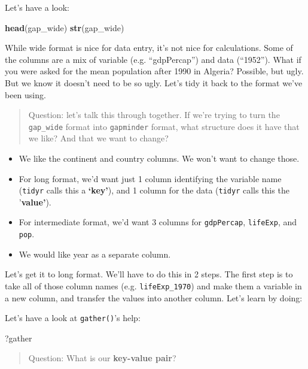 \documentclass[]{book}
\newenvironment{Shaded}{\begin{snugshade}}{\end{snugshade}}
\newcommand{\KeywordTok}[1]{\textcolor[rgb]{0.13,0.29,0.53}{\textbf{{#1}}}}
\newcommand{\NormalTok}[1]{{#1}}
\providecommand{\tightlist}{%
  \setlength{\itemsep}{0pt}\setlength{\parskip}{0pt}}
\theoremstyle{definition}
\theoremstyle{definition}
\theoremstyle{definition}
\theoremstyle{remark}
\begin{document}
Let's have a look:

\begin{Shaded}
\begin{Highlighting}[]
\KeywordTok{head}\NormalTok{(gap_wide)}
\KeywordTok{str}\NormalTok{(gap_wide)}
\end{Highlighting}
\end{Shaded}

While wide format is nice for data entry, it's not nice for
calculations. Some of the columns are a mix of variable (e.g.
``gdpPercap'') and data (``1952''). What if you were asked for the mean
population after 1990 in Algeria? Possible, but ugly. But we know it
doesn't need to be so ugly. Let's tidy it back to the format we've been
using.

\begin{quote}
Question: let's talk this through together. If we're trying to turn the
\texttt{gap\_wide} format into \texttt{gapminder} format, what structure
does it have that we like? And that we want to change?
\end{quote}

\begin{itemize}
\tightlist
\item
  We like the continent and country columns. We won't want to change
  those.
\item
  For long format, we'd want just 1 column identifying the variable name
  (\texttt{tidyr} calls this a \textbf{`key'}), and 1 column for the
  data (\texttt{tidyr} calls this the '\textbf{value'}).
\item
  For intermediate format, we'd want 3 columns for \texttt{gdpPercap},
  \texttt{lifeExp}, and \texttt{pop}.
\item
  We would like year as a separate column.
\end{itemize}

Let's get it to long format. We'll have to do this in 2 steps. The first
step is to take all of those column names (e.g. \texttt{lifeExp\_1970})
and make them a variable in a new column, and transfer the values into
another column. Let's learn by doing:

Let's have a look at \texttt{gather()}'s help:

\begin{Shaded}
\begin{Highlighting}[]
\NormalTok{?gather}
\end{Highlighting}
\end{Shaded}

\begin{quote}
Question: What is our \textbf{key-value pair}?
\end{quote}
\end{document}

